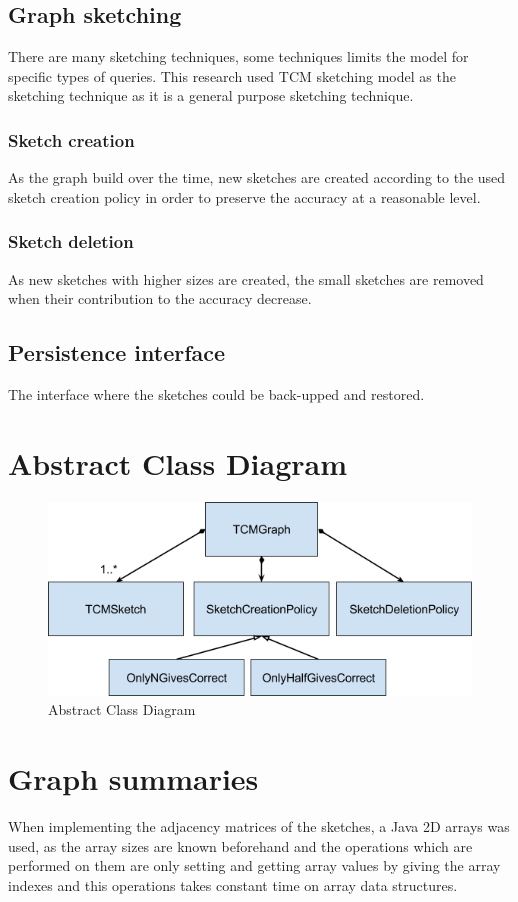 \documentclass[12pt]{report}
\numberwithin{figure}{section}
\numberwithin{table}{section}
\begin{document}
\subsection*{Graph sketching}
There are many sketching techniques, some techniques limits the model for specific types of queries. This research used TCM sketching model as the sketching technique as it is a general purpose sketching technique.

\subsubsection*{Sketch creation}
As the graph build over the time, new sketches are created according to the used sketch creation policy in order to preserve the accuracy at a reasonable level.  

\subsubsection*{Sketch deletion}
As new sketches with higher sizes are created,  the small sketches are removed when their contribution to the accuracy decrease.

\subsection*{Persistence interface}
The interface where the sketches could be back-upped and restored.

\section{Abstract Class Diagram}

\begin{figure}[H]
\centering
\includegraphics[scale=0.8]{images/image06}
\caption{Abstract Class Diagram}
\end{figure}

\section{Graph summaries}
When implementing the adjacency matrices of the sketches, a Java 2D arrays was used, as the array sizes are known  beforehand and the operations which are performed on them are only setting and getting array values by giving the array indexes and this operations takes constant time on array data structures.
\end{document}
